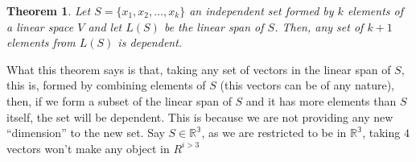 \documentclass{book}
\newtheorem{theorem}{Theorem}[chapter]
\begin{document}
\begin{theorem}
    Let $S=\{x_1,x_2,\dots,x_k\}$ an independent set formed by $k$ elements
    of a linear space $V$ and let $L(S)$ be the linear span of $S$. Then, any
    set of $k+1$ elements from $L(S)$ is dependent.
\end{theorem}

What this theorem says is that, taking any set of vectors in the linear span of
$S$, this is, formed by combining elements of $S$ (this vectors can be of any
nature), then, if we form a subset of the linear span of $S$ and it has more
elements than $S$ itself, the set will be dependent. This is because we are not
providing any new ``dimension'' to the new set. Say $S\in \mathbb{R^{3}}$, as
we are restricted to be in $\mathbb{R^{3}}$, taking $4$ vectors won't make any
object in $R^{i>3}$
\end{document}
